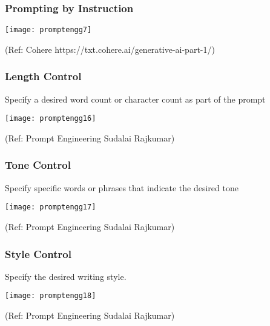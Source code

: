 \begin{frame}[fragile]\frametitle{Prompting by Instruction}

\begin{center}
\texttt{[image: promptengg7]}

{\tiny (Ref: Cohere https://txt.cohere.ai/generative-ai-part-1/)}

\end{center}		

\end{frame}



\begin{frame}[fragile]\frametitle{Length Control}

Specify a desired word count or character count as part of the prompt

\begin{center}
\texttt{[image: promptengg16]}

{\tiny (Ref: Prompt Engineering Sudalai Rajkumar)}

\end{center}		

\end{frame}

\begin{frame}[fragile]\frametitle{Tone Control}

Specify specific words or phrases that indicate the desired tone

\begin{center}
\texttt{[image: promptengg17]}

{\tiny (Ref: Prompt Engineering Sudalai Rajkumar)}

\end{center}		

\end{frame}

\begin{frame}[fragile]\frametitle{Style Control}

Specify the desired writing style.

\begin{center}
\texttt{[image: promptengg18]}

{\tiny (Ref: Prompt Engineering Sudalai Rajkumar)}

\end{center}		
	
\end{frame}

